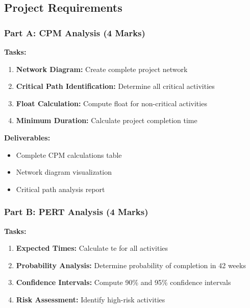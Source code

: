 \documentclass[
  letterpaper,
  DIV=11,
  numbers=noendperiod]{scrreprt}
\providecommand{\tightlist}{%
  \setlength{\itemsep}{0pt}\setlength{\parskip}{0pt}}
\begin{document}
\subsection{Project Requirements}\label{project-requirements}

\subsubsection{Part A: CPM Analysis (4
Marks)}\label{part-a-cpm-analysis-4-marks}

\textbf{Tasks:}

\begin{enumerate}
\def\labelenumi{\arabic{enumi}.}
\tightlist
\item
  \textbf{Network Diagram:} Create complete project network
\item
  \textbf{Critical Path Identification:} Determine all critical
  activities
\item
  \textbf{Float Calculation:} Compute float for non-critical activities
\item
  \textbf{Minimum Duration:} Calculate project completion time
\end{enumerate}

\textbf{Deliverables:}

\begin{itemize}
\tightlist
\item
  Complete CPM calculations table
\item
  Network diagram visualization
\item
  Critical path analysis report
\end{itemize}

\subsubsection{Part B: PERT Analysis (4
Marks)}\label{part-b-pert-analysis-4-marks}

\textbf{Tasks:}

\begin{enumerate}
\def\labelenumi{\arabic{enumi}.}
\tightlist
\item
  \textbf{Expected Times:} Calculate te for all activities
\item
  \textbf{Probability Analysis:} Determine probability of completion in
  42 weeks
\item
  \textbf{Confidence Intervals:} Compute 90\% and 95\% confidence
  intervals
\item
  \textbf{Risk Assessment:} Identify high-risk activities
\end{enumerate}
\end{document}
